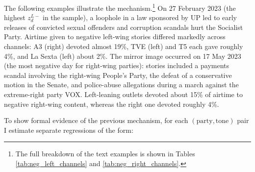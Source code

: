 \documentclass[12pt]{article}
\begin{document}
The following examples illustrate the mechanism.\footnote{The full breakdown of the text examples is shown in Tables \ref{tab:neg_left_channels} and \ref{tab:neg_right_channels}.} On {27 February 2023} (the highest $z_d^{L-}$ in the sample), a loophole in a law sponsored by UP led to early releases of convicted sexual offenders and corruption scandals hurt the Socialist Party. Airtime given to negative left-wing stories differed markedly across channels: A3 (right) devoted almost 19\%, TVE (left) and T5 each gave roughly 4\%, and La Sexta (left) about 2\%. The mirror image occurred on {17 May 2023} (the most negative day for right-wing parties): stories included a payments scandal involving the right-wing People’s Party, the defeat of a conservative motion in the Senate, and police-abuse allegations during a march against the extreme-right party VOX. Left-leaning outlets devoted about 15\% of airtime to negative right-wing content, whereas the right one devoted roughly 4\%. 








To show formal evidence of the previous mechanism, for each $(\text{party},\text{tone})$ pair I estimate separate regressions of the form:
\end{document}
